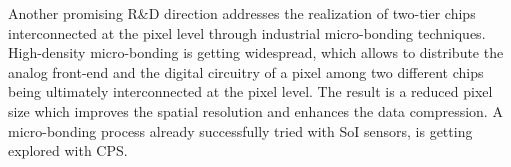   Another promising R\&D direction addresses the realization of 
two-tier chips interconnected at the pixel level through industrial 
micro-bonding techniques. High-density micro-bonding is getting 
widespread, which allows to distribute the analog front-end and 
the digital circuitry of a pixel among two different chips being 
ultimately interconnected at the pixel level. The result is a 
reduced pixel size which improves the spatial resolution and 
enhances the data compression. A micro-bonding process already 
successfully tried with SoI sensors, is getting explored with CPS.
